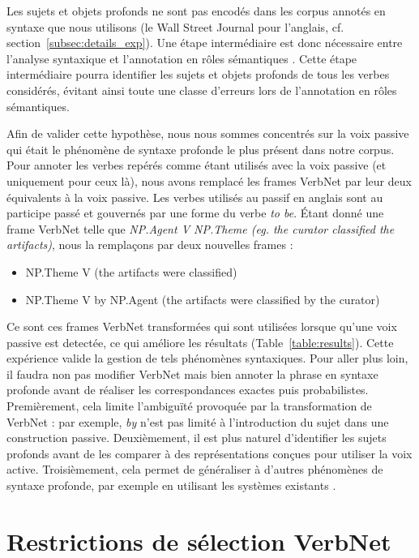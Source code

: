 Les sujets et objets profonds ne sont pas encodés dans les corpus annotés en
syntaxe que nous utilisons (le Wall Street Journal pour l'anglais, cf.
section~\ref{subsec:details_exp}). Une étape intermédiaire est donc nécessaire
entre l'analyse syntaxique et l'annotation en rôles sémantiques
\citep{bonfante2011modular, ribeyre2013systeme}. Cette étape intermédiaire
pourra identifier les sujets et objets profonds de tous les verbes considérés,
évitant ainsi toute une classe d'erreurs lors de l'annotation en rôles
sémantiques. 

Afin de valider cette hypothèse, nous nous sommes concentrés sur la voix
passive qui était le phénomène de syntaxe profonde le plus présent dans notre
corpus.  Pour annoter les verbes repérés comme étant utilisés avec la voix
passive (et uniquement pour ceux là), nous avons remplacé les frames VerbNet
par leur deux équivalents à la voix passive. Les verbes utilisés au passif en
anglais sont au participe passé et gouvernés par une forme du verbe \textit{to
be}. Étant donné une frame VerbNet telle que \textit{NP.Agent V NP.Theme (eg.
the curator classified the artifacts)}, nous la remplaçons par deux nouvelles
frames :

\begin{itemize}
    \item NP.Theme V (the artifacts were classified)
    \item NP.Theme V by NP.Agent (the artifacts were classified by the curator)
\end{itemize}

Ce sont ces frames VerbNet transformées qui sont utilisées lorsque qu'une voix
passive est detectée, ce qui améliore les résultats
(Table~\ref{table:results}). Cette expérience valide la gestion de tels
phénomènes syntaxiques. Pour aller plus loin, il faudra non pas modifier
VerbNet mais bien annoter la phrase en syntaxe profonde avant de réaliser les
correspondances exactes puis probabilistes. Premièrement, cela limite
l'ambiguïté provoquée par la transformation de VerbNet : par exemple, \textit{by}
n'est pas limité à l'introduction du sujet dans une construction passive.
Deuxièmement, il est plus naturel d'identifier les sujets profonds avant de les
comparer à des représentations conçues pour utiliser la voix active.
Troisièmement, cela permet de généraliser à d'autres phénomènes de syntaxe
profonde, par exemple en utilisant les systèmes existants
\citep{bonfante2011modular,ribeyre2013systeme}.

\section{Restrictions de sélection VerbNet}
\label{restrictions_selection}

